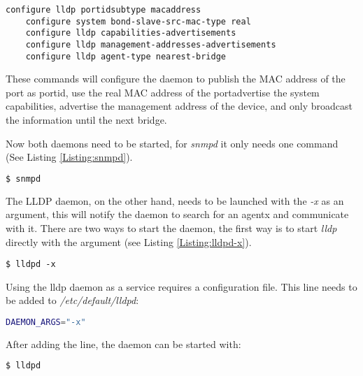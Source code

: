 \begin{lstlisting}[label=Listing:lldpcli,captionpos=b,caption={Commands to configure lldpd with lldpcli}]
    configure lldp portidsubtype macaddress
    configure system bond-slave-src-mac-type real
    configure lldp capabilities-advertisements
    configure lldp management-addresses-advertisements
    configure lldp agent-type nearest-bridge
\end{lstlisting}

These commands will configure the daemon to publish the MAC address of the port as portid, use the real MAC address of the portadvertise the system capabilities, advertise the management address of the device, and only broadcast the information until the next bridge.

Now both daemons need to be started, for \textit{snmpd} it only needs one command (See Listing \ref{Listing:snmpd}). 
\begin{lstlisting}[language=bash,label=Listing:snmpd,captionpos=b,caption={Starting snmpd.}]
    $ snmpd
\end{lstlisting}

The LLDP daemon, on the other hand, needs to be launched with the \textit{-x} as an argument, this will notify the daemon to search for an agentx and communicate with it. There are two ways to start the daemon, the first way is to start \textit{lldp} directly with the argument (see Listing \ref{Listing:lldpd-x}).
\begin{lstlisting}[label=Listing:lldpd-x,captionpos=b,caption={starting lldpd with agentx support.}]
    $ lldpd -x
\end{lstlisting}

Using the lldp daemon as a service requires a configuration file. This line needs to be added to \textit{/etc/default/lldpd}:
\begin{lstlisting}[language=bash,label=Listing:lldpd-config,captionpos=b,caption={/etc/default/lldpd - Starting the daemon with agent x support.}]
    DAEMON_ARGS="-x"
\end{lstlisting}

\newpage
After adding the line, the daemon can be started with:
\begin{lstlisting}[language=bash,label=Listing:lldpd,captionpos=b,caption={Starting lldpd}]
    $ lldpd
\end{lstlisting}